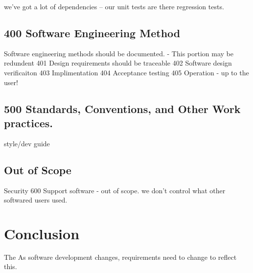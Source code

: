 \documentclass{anstrans}
\begin{document}
we've got a lot of dependencies -- our unit tests are there regression tests.

\subsection{400 Software Engineering Method}
Software engineering methods should be documented.
- This portion may be redundent
401 Design requirements should be traceable
402 Software design verificaiton
403 Implimentation
404 Acceptance testing
405 Operation - up to the user!

\subsection{500 Standards, Conventions, and Other Work practices.}

style/dev guide


\subsection{Out of Scope}
Security
600 Support software - out of scope. we don't control what other softwared users used. 


\section{Conclusion}

The 
As software development changes, requirements need to change to reflect this.



\end{document}

